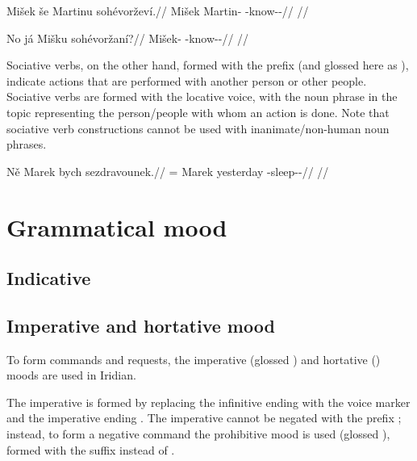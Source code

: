 \pex
\begingl
\gla Mišek še Martinu sohévoržev\'i.//
\glb Mišek \Com{} Martin-\Ins{} \Rec{}-know-\Av{}-\Cont{}//
\glft {}//
\endgl
\xe

\pex
\begingl
\gla No já Mišku sohévoržaní?//
\glb \Q{}  Mišek-\Ins{} \Rec{}-know-\Av{}-\Ret{}//
\glft {}//
\endgl
\xe

Sociative verbs, on the other hand, formed with the prefix  (and glossed here as \Soc{}), indicate actions that are performed with another person or other people. Sociative verbs are formed with the locative voice, with the noun phrase in the topic representing the person/people with whom an action is done. Note that sociative verb constructions cannot be used with inanimate/non-human noun phrases.

\pex
\begingl
\gla N\v{e} Marek bych sezdravounek.//
\glb \Pl{}= Marek yesterday \Soc{}-sleep-\Lv{}-\Pf{}//
\glft {}//
\endgl
\xe

\section{Grammatical mood}

\subsection{Indicative}

\subsection{Imperative and hortative mood}\label{sec:imp-hort}

To form commands and requests, the imperative (glossed ) and hortative () moods are used in Iridian.

The imperative is formed by replacing the infinitive ending  with the voice marker and the imperative ending . The imperative cannot be negated with the prefix ; instead, to form a negative command the prohibitive mood is used (glossed ), formed with the suffix  instead of .

